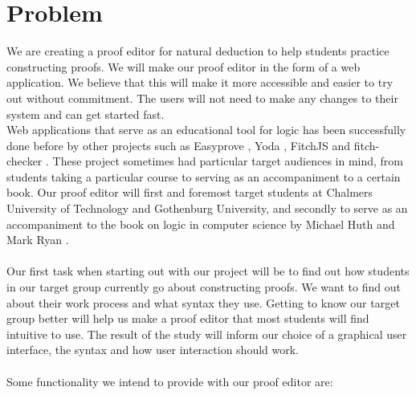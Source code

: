 \section{Problem}
%
We are creating a proof editor for natural deduction to help students practice constructing proofs.
%
We will make our proof editor in the form of a web application.
%
We believe that this will make it more accessible and easier to try out without commitment.
%
The users will not need to make any changes to their system and can get started fast. \\
%
Web applications that serve as an educational tool for logic has been successfully done before by other projects such as Easyprove \cite{easyprove}, Yoda \cite{Yoda}, FitchJS \cite{rieppel} and fitch-checker \cite{klement}. 
%
These project sometimes had particular target audiences in mind, from students taking a particular course to serving as an accompaniment to a certain book.
%
Our proof editor will first and foremost target students at Chalmers University of Technology and Gothenburg University, and secondly to serve as an accompaniment to the book on logic in computer science by Michael Huth and Mark Ryan \cite{huth_ryan_2018}. \\ \\



Our first task when starting out with our project will be to find out how students in our target group currently go about constructing proofs.
%
We want to find out about their work process and what syntax they use.
%
Getting to know our target group better will help us make a proof editor that most students will find intuitive to use.
%
The result of the study will inform our choice of a graphical user interface, the syntax and how user interaction should work. \\ \\


%
Some functionality we intend to provide with our proof editor are:
%

